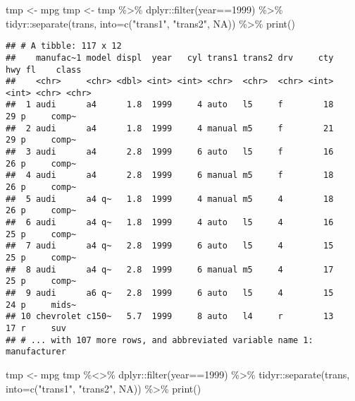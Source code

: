 \documentclass[
]{article}
\newenvironment{Shaded}{\begin{snugshade}}{\end{snugshade}}
\newcommand{\AttributeTok}[1]{\textcolor[rgb]{0.77,0.63,0.00}{#1}}
\newcommand{\ConstantTok}[1]{\textcolor[rgb]{0.00,0.00,0.00}{#1}}
\newcommand{\DecValTok}[1]{\textcolor[rgb]{0.00,0.00,0.81}{#1}}
\newcommand{\FunctionTok}[1]{\textcolor[rgb]{0.00,0.00,0.00}{#1}}
\newcommand{\NormalTok}[1]{#1}
\newcommand{\OtherTok}[1]{\textcolor[rgb]{0.56,0.35,0.01}{#1}}
\newcommand{\SpecialCharTok}[1]{\textcolor[rgb]{0.00,0.00,0.00}{#1}}
\newcommand{\StringTok}[1]{\textcolor[rgb]{0.31,0.60,0.02}{#1}}
\begin{document}
\begin{Shaded}
\begin{Highlighting}[]
\NormalTok{tmp }\OtherTok{\textless{}{-}}\NormalTok{ mpg}
\NormalTok{tmp }\OtherTok{\textless{}{-}}
\NormalTok{  tmp }\SpecialCharTok{\%\textgreater{}\%}
\NormalTok{  dplyr}\SpecialCharTok{::}\FunctionTok{filter}\NormalTok{(year}\SpecialCharTok{==}\DecValTok{1999}\NormalTok{) }\SpecialCharTok{\%\textgreater{}\%}
\NormalTok{  tidyr}\SpecialCharTok{::}\FunctionTok{separate}\NormalTok{(trans, }\AttributeTok{into=}\FunctionTok{c}\NormalTok{(}\StringTok{"trans1"}\NormalTok{, }\StringTok{"trans2"}\NormalTok{, }\ConstantTok{NA}\NormalTok{)) }\SpecialCharTok{\%\textgreater{}\%}
  \FunctionTok{print}\NormalTok{()}
\end{Highlighting}
\end{Shaded}

\begin{verbatim}
## # A tibble: 117 x 12
##    manufac~1 model displ  year   cyl trans1 trans2 drv     cty   hwy fl    class
##    <chr>     <chr> <dbl> <int> <int> <chr>  <chr>  <chr> <int> <int> <chr> <chr>
##  1 audi      a4      1.8  1999     4 auto   l5     f        18    29 p     comp~
##  2 audi      a4      1.8  1999     4 manual m5     f        21    29 p     comp~
##  3 audi      a4      2.8  1999     6 auto   l5     f        16    26 p     comp~
##  4 audi      a4      2.8  1999     6 manual m5     f        18    26 p     comp~
##  5 audi      a4 q~   1.8  1999     4 manual m5     4        18    26 p     comp~
##  6 audi      a4 q~   1.8  1999     4 auto   l5     4        16    25 p     comp~
##  7 audi      a4 q~   2.8  1999     6 auto   l5     4        15    25 p     comp~
##  8 audi      a4 q~   2.8  1999     6 manual m5     4        17    25 p     comp~
##  9 audi      a6 q~   2.8  1999     6 auto   l5     4        15    24 p     mids~
## 10 chevrolet c150~   5.7  1999     8 auto   l4     r        13    17 r     suv  
## # ... with 107 more rows, and abbreviated variable name 1: manufacturer
\end{verbatim}

\begin{Shaded}
\begin{Highlighting}[]
\NormalTok{tmp }\OtherTok{\textless{}{-}}\NormalTok{ mpg}
\NormalTok{tmp }\SpecialCharTok{\%\textless{}\textgreater{}\%}
\NormalTok{  dplyr}\SpecialCharTok{::}\FunctionTok{filter}\NormalTok{(year}\SpecialCharTok{==}\DecValTok{1999}\NormalTok{) }\SpecialCharTok{\%\textgreater{}\%}
\NormalTok{  tidyr}\SpecialCharTok{::}\FunctionTok{separate}\NormalTok{(trans, }\AttributeTok{into=}\FunctionTok{c}\NormalTok{(}\StringTok{"trans1"}\NormalTok{, }\StringTok{"trans2"}\NormalTok{, }\ConstantTok{NA}\NormalTok{)) }\SpecialCharTok{\%\textgreater{}\%}
  \FunctionTok{print}\NormalTok{()}
\end{Highlighting}
\end{Shaded}
\end{document}
